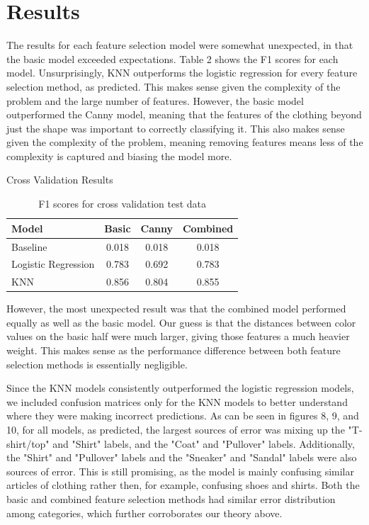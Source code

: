 
\section{Results}
\label{sec:results}

The results for each feature selection model were somewhat unexpected, in that the basic model exceeded expectations. Table 2 shows the F1 scores for each model. Unsurprisingly, KNN outperforms the logistic regression for every feature selection method, as predicted. This makes sense given the complexity of the problem and the large number of features. However, the basic model outperformed the Canny model, meaning that the features of the clothing beyond just the shape was important to correctly classifying it. This also makes sense given the complexity of the problem, meaning removing features means less of the complexity is captured and biasing the model more.

\begin{table}[!h]
    \centering
    Cross Validation Results\\
    \begin{tabular}{|l|c c c|}
    \hline
         Model & Basic & Canny & Combined\\
         \hline
         Baseline & 0.018 & 0.018 & 0.018\\
         Logistic Regression & 0.783 & 0.692 & 0.783\\
         KNN & 0.856 & 0.804 & 0.855\\
         \hline
    \end{tabular}
    \caption{F1 scores for cross validation test data}
    \label{tab:my_label}
\end{table}

However, the most unexpected result was that the combined model performed equally as well as the basic model. Our guess is that the distances between color values on the basic half were much larger, giving those features a much heavier weight. This makes sense as the performance difference between both feature selection methods is essentially negligible.

Since the KNN models consistently outperformed the logistic regression models, we included confusion matrices only for the KNN models to better understand where they were making incorrect predictions. As can be seen in figures 8, 9, and 10, for all models, as predicted, the largest sources of error was mixing up the "T-shirt/top" and "Shirt" labels, and the "Coat" and "Pullover" labels. Additionally,  the "Shirt" and "Pullover" labels and the "Sneaker" and "Sandal" labels were also sources of error. This is still promising, as the model is mainly confusing similar articles of clothing rather then, for example, confusing shoes and shirts. Both the basic and combined feature selection methods had similar error distribution among categories, which further corroborates our theory above.


